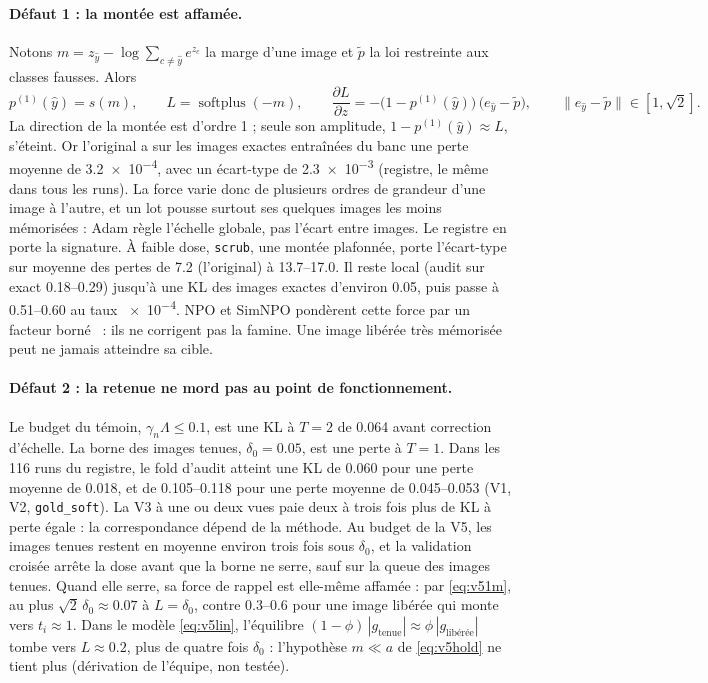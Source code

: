 \documentclass[11pt,a4paper]{article}
\newcommand{\code}[1]{\texttt{#1}}
\begin{document}
\paragraph{Défaut 1 : la montée est affamée.} Notons $m=z_{\hat y}-\log\sum_{c\ne\hat y}e^{z_c}$ la
marge d'une image et $\tilde p$ la loi restreinte aux classes fausses. Alors
\begin{equation}\label{eq:v51m}
  p^{(1)}(\hat y)=s(m),\qquad L=\operatorname{softplus}(-m),\qquad
  \frac{\partial L}{\partial z}=-\bigl(1-p^{(1)}(\hat y)\bigr)\,\bigl(e_{\hat y}-\tilde p\bigr),\qquad
  \bigl\|e_{\hat y}-\tilde p\bigr\|\in[1,\sqrt2].
\end{equation}
La direction de la montée est d'ordre 1 ; seule son amplitude, $1-p^{(1)}(\hat y)\approx L$, s'éteint.
Or l'original a sur les images exactes entraînées du banc une perte moyenne de \num{3.2e-4}, avec un
écart-type de \num{2.3e-3} (registre, le même dans tous les runs). La force varie donc de plusieurs
ordres de grandeur d'une image à l'autre, et un lot pousse surtout ses quelques images les moins
mémorisées : Adam règle l'échelle globale, pas l'écart entre images. Le registre en porte la
signature. À faible dose, \code{scrub}, une montée plafonnée, porte l'écart-type sur moyenne des
pertes de \num{7.2} (l'original) à \numrange{13.7}{17.0}. Il reste local (audit sur exact
\numrange{0.18}{0.29}) jusqu'à une KL des images exactes d'environ \num{0.05}, puis passe à
\numrange{0.51}{0.60} au taux \num{e-4}. NPO et SimNPO pondèrent cette force par un facteur
borné~\cite{zhang2024npo,fan2025simnpo} : ils ne corrigent pas la famine. Une image libérée très
mémorisée peut ne jamais atteindre sa cible.

\paragraph{Défaut 2 : la retenue ne mord pas au point de fonctionnement.} Le budget du témoin,
$\gamma_n\Lambda\le\num{0.1}$, est une KL à $T=2$ de \num{0.064} avant correction d'échelle. La borne
des images tenues, $\delta_0=\num{0.05}$, est une perte à $T=1$. Dans les 116 runs du registre, le
fold d'audit atteint une KL de \num{0.060} pour une perte moyenne de \num{0.018}, et de
\numrange{0.105}{0.118} pour une perte moyenne de \numrange{0.045}{0.053} (V1, V2, \code{gold\_soft}).
La V3 à une ou deux vues paie deux à trois fois plus de KL à perte égale : la correspondance dépend
de la méthode. Au budget de la V5, les images tenues restent en moyenne environ trois fois sous
$\delta_0$, et la validation croisée arrête la dose avant que la borne ne serre, sauf sur la queue
des images tenues. Quand elle serre, sa force de rappel est elle-même affamée : par \eqref{eq:v51m},
au plus $\sqrt2\,\delta_0\approx\num{0.07}$ à $L=\delta_0$, contre \numrange{0.3}{0.6} pour une image
libérée qui monte vers $t_i\approx1$. Dans le modèle \eqref{eq:v5lin}, l'équilibre
$(1-\phi)\,|g_{\text{tenue}}|\approx\phi\,|g_{\text{libérée}}|$ tombe vers $L\approx\num{0.2}$, plus de
quatre fois $\delta_0$ : l'hypothèse $m\ll a$ de \eqref{eq:v5hold} ne tient plus (dérivation de
l'équipe, non testée).
\end{document}
